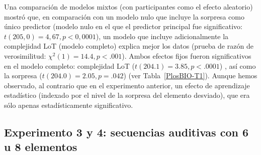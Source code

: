 Una comparación de modelos mixtos (con participantes como el efecto aleatorio) mostró que, en comparación con un modelo nulo que incluye la sorpresa como único predictor (modelo nulo en el que el predictor principal fue significativo: $t (205,0) = 4,67, p <0,0001$), un modelo que incluye adicionalmente la complejidad LoT (modelo completo) explica mejor los datos (prueba de razón de verosimilitud: $\chi^2(1) = 14.4, p <.001$). Ambos efectos fijos fueron significativos en el modelo completo: complejidad LoT ($t ( 204.1) = 3.85 , p <.0001$) , así como la sorpresa ($t ( 204.0 ) = 2.05 , p= .042$) (ver Tabla~\ref{PlosBIO-T1}). Aunque hemos observado, al contrario que en el experimento anterior, un efecto de aprendizaje estadístico (indexado por el nivel de la sorpresa del elemento desviado), que era sólo apenas estadísticamente significativo.

\subsection{Experimento 3 y 4: secuencias auditivas con 6 u 8 elementos}



